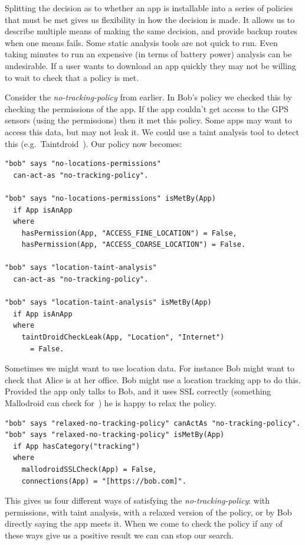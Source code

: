 \documentclass[twoside,letterpaper]{soups}
\begin{document}
Splitting the decision as to whether an app is installable into a series of policies that must be met gives us flexibility in how the decision is made.
It allows us to describe multiple means of making the same decision, and provide backup routes when one means fails.
Some static analysis tools are not quick to run.
Even taking minutes to run an expensive (in terms of battery power) analysis can be undesirable.
If a user wants to download an app quickly they may not be willing to wait to check that a policy is met.

Consider the \emph{no-tracking-policy} from earlier.
In Bob's policy we checked this by checking the permissions of the app.
If the app couldn't get access to the GPS sensors (using the permissions) then it met this policy.
Some apps may want to access this data, but may not leak it.
We could use a taint analysis tool to detect this (e.g.~Taintdroid~\citep{Fritz:2013vi}).
Our policy now becomes:

\begin{lstlisting}
"bob" says "no-locations-permissions"
  can-act-as "no-tracking-policy".

"bob" says "no-locations-permissions" isMetBy(App)
  if App isAnApp
  where
    hasPermission(App, "ACCESS_FINE_LOCATION") = False,
    hasPermission(App, "ACCESS_COARSE_LOCATION") = False.

"bob" says "location-taint-analysis"
  can-act-as "no-tracking-policy".

"bob" says "location-taint-analysis" isMetBy(App)
  if App isAnApp
  where
    taintDroidCheckLeak(App, "Location", "Internet")
      = False.
\end{lstlisting}

Sometimes we might want to use location data.
For instance Bob might want to check that Alice is at her office.
Bob might use a location tracking app to do this.
Provided the app only talks to Bob, and it uses SSL correctly (something Mallodroid can check for~\citep{Fahl:2012dj}) he is happy to relax the policy.

\begin{lstlisting}
"bob" says "relaxed-no-tracking-policy" canActAs "no-tracking-policy".
"bob" says "relaxed-no-tracking-policy" isMetBy(App)
  if App hasCategory("tracking")
  where
    mallodroidSSLCheck(App) = False,
    connections(App) = "[https://bob.com]".
\end{lstlisting}

This gives us four different ways of satisfying the \emph{no-tracking-policy}:
  with permissions,
  with taint analysis,
  with a relaxed version of the policy,
  or by Bob directly saying the app meets it.
When we come to check the policy if any of these ways give us a positive result we can can stop our search.
\end{document}
